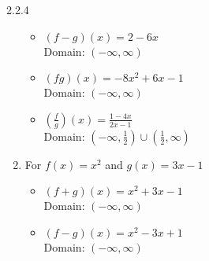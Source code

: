 \begin{Answer}{2.2.4}
\begin{enumerate}
\begin{multicols}{2}
\begin{itemize}
				\vfill

				\columnbreak

				\item $(f-g)(x) = 2-6x$ \\
				Domain:  $(-\infty, \infty)$


			\end{itemize}

		\end{multicols}

		\begin{multicols}{2}

			\begin{itemize}

				\item $(fg)(x) = -8x^2+6x-1$ \\
				Domain: $(-\infty, \infty)$

				\vfill

				\columnbreak

				\item $\left(\frac{f}{g}\right)(x) = \frac{1-4x}{2x-1}$ \\
				Domain:  $\left(-\infty, \frac{1}{2} \right) \cup \left(\frac{1}{2}, \infty \right)$


			\end{itemize}

		\end{multicols}

		\newpage

		\item For $f(x) = x^2$ and $g(x) = 3x-1$

		\begin{multicols}{2}

			\begin{itemize}

				\item $(f+g)(x) = x^2+3x-1$ \\
				Domain: $(-\infty, \infty)$

				\vfill

				\columnbreak

				\item $(f-g)(x) = x^2-3x+1$ \\
				Domain:  $(-\infty, \infty)$


			\end{itemize}

		\end{multicols}

		\begin{multicols}{2}


\end{multicols}
\end{enumerate}
\end{Answer}
